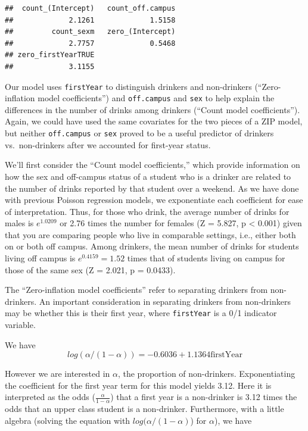 \documentclass[
]{krantz}
\begin{document}
\begin{verbatim}
##  count_(Intercept)   count_off.campus 
##             2.1261             1.5158 
##         count_sexm   zero_(Intercept) 
##             2.7757             0.5468 
## zero_firstYearTRUE 
##             3.1155
\end{verbatim}

Our model uses \texttt{firstYear} to distinguish drinkers and non-drinkers (``Zero-inflation model coefficients'') and \texttt{off.campus} and \texttt{sex} to help explain the differences in the number of drinks among drinkers (``Count model coefficients''). Again, we could have used the same covariates for the two pieces of a ZIP model, but neither \texttt{off.campus} or \texttt{sex} proved to be a useful predictor of drinkers vs.~non-drinkers after we accounted for first-year status.

We'll first consider the ``Count model coefficients,'' which provide information on how the sex and off-campus status of a student who is a drinker are related to the number of drinks reported by that student over a weekend. As we have done with previous Poisson regression models, we exponentiate each coefficient for ease of interpretation. Thus, for those who drink, the average number of drinks for males is \(e^{1.0209}\) or 2.76 times the number for females (Z = 5.827, p \textless{} 0.001) given that you are comparing people who live in comparable settings, i.e., either both on or both off campus. Among drinkers, the mean number of drinks for students living off campus is \(e^{0.4159}=1.52\) times that of students living on campus for those of the same sex (Z = 2.021, p = 0.0433).

The ``Zero-inflation model coefficients'' refer to separating drinkers from non-drinkers. An important consideration in separating drinkers from non-drinkers may be whether this is their first year, where \texttt{firstYear} is a 0/1 indicator variable.

We have
\[ 
log(\alpha/(1-\alpha)) =-0.6036+1.1364\textrm{firstYear}
 \]

However we are interested in \(\alpha\), the proportion of non-drinkers. Exponentiating the coefficient for the first year term for this model yields 3.12. Here it is interpreted as the odds (\(\frac{\alpha}{1-\alpha}\)) that a first year is a non-drinker is 3.12 times the odds that an upper class student is a non-drinker. Furthermore, with a little algebra (solving the equation with \(log(\alpha/(1-\alpha)\)) for \(\alpha\)),
we have
\end{document}
